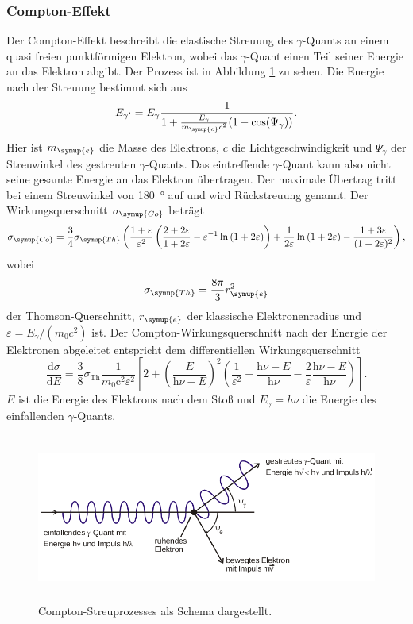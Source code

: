 \subsubsection{Compton-Effekt}
Der Compton-Effekt beschreibt die elastische Streuung des $\gamma$-Quants an einem quasi freien punktförmigen Elektron, wobei das $\gamma$-Quant einen Teil seiner Energie an das Elektron abgibt.
Der Prozess ist in Abbildung \ref{fig:Compton} zu sehen.
Die Energie nach der Streuung bestimmt sich aus
\begin{equation}
E_{\gamma'}=E_{\gamma}\frac{1}{1+\frac{E_{\gamma}}{m_{\symup{e}} c^2}(1-\cos(\Psi_{\gamma}))}.
\end{equation}
Hier ist $m_{\symup{e}}$ die Masse des Elektrons, $c$ die Lichtgeschwindigkeit und $\Psi_{\gamma}$ der Streuwinkel des gestreuten $\gamma$-Quants.
Das eintreffende $\gamma$-Quant kann also nicht seine gesamte Energie an das Elektron übertragen.
Der maximale Übertrag tritt bei einem Streuwinkel von \SI{180}{\degree} auf und wird Rückstreuung genannt.
Der Wirkungsquerschnitt $\sigma_{\symup{Co}}$ beträgt
\begin{align*}
      \sigma_{\symup{Co}} = \frac{3}{4}\sigma_{\symup{Th}}\left(\frac{1+\varepsilon}{\varepsilon^2}\left(\frac{2+2\varepsilon}{1+2\varepsilon}-\varepsilon^{-1}\ln{(1+2\varepsilon)}\right)
      + \frac{1}{2\varepsilon}\ln{(1+2\varepsilon)} - \frac{1+3\varepsilon}{(1+2\varepsilon)^2}\right),
\end{align*}
wobei 
\begin{equation*}
\sigma_{\symup{Th}} =\frac{8\pi}{3}r_{\symup{e}}^2
\end{equation*}
der Thomson-Querschnitt, $r_{\symup{e}}$ der klassische Elektronenradius und $\varepsilon=E_{\gamma}/(m_0c^2)$ ist.
Der Compton-Wirkungsquerschnitt nach der Energie der Elektronen abgeleitet entspricht dem differentiellen Wirkungsquerschnitt
\begin{equation}
  \label{eq:wirk}
  \frac{\text{d}\sigma}{\text{d}E} = \frac{3}{8}\sigma_\text{Th} \frac{1}{m_0\text{c}^2\varepsilon^2}
    \left[ 2 + \left(\frac{E}{\text{h}\nu - E}\right)^2
      \left( \frac{1}{\varepsilon^2} + \frac{\text{h}\nu-E}{\text{h}\nu} - \frac{2}{\varepsilon}\frac{\text{h}\nu-E}{\text{h}\nu} \right)
    \right].
\end{equation}
$E$ ist die Energie des Elektrons nach dem Stoß und $E_\gamma=h\nu$ die Energie des einfallenden $\gamma$-Quants.
 \begin{figure}
   \centering
   \includegraphics[height=5.5cm]{content/pictures/Compton.png}
   \caption{Compton-Streuprozesses als Schema dargestellt.\cite{V18}}
   \label{fig:Compton}
 \end{figure}

